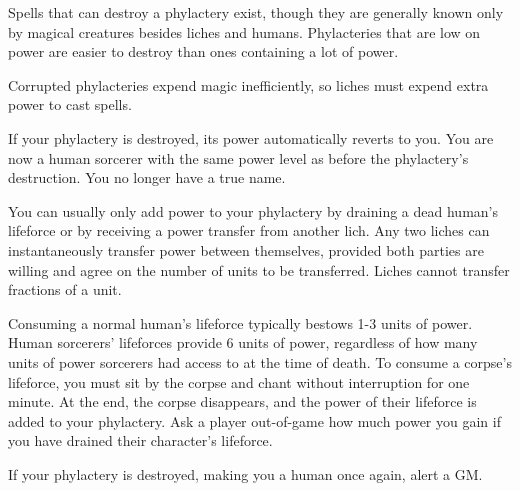 \documentclass[green]{Sel}
\begin{document}
Spells that can destroy a phylactery exist, though they are generally known only by magical creatures besides liches and humans. Phylacteries that are low on power are easier to destroy than ones containing a lot of power.

Corrupted phylacteries expend magic inefficiently, so liches must expend extra power to cast spells.

If your phylactery is destroyed, its power automatically reverts to you. You are now a human sorcerer with the same power level as before the phylactery's destruction. You no longer have a true name.

You can usually only add power to your phylactery by draining a dead human's lifeforce or by receiving a power transfer from another lich. Any two liches can instantaneously transfer power between themselves, provided both parties are willing and agree on the number of units to be transferred. Liches cannot transfer fractions of a unit.

Consuming a normal human's lifeforce typically bestows 1-3 units of power. Human sorcerers' lifeforces provide 6 units of power, regardless of how many units of power sorcerers had access to at the time of death. To consume a corpse's lifeforce, you must sit by the corpse and chant without interruption for one minute. At the end, the corpse disappears, and the power of their lifeforce is added to your phylactery. Ask a player out-of-game how much power you gain if you have drained their character's lifeforce.

If your phylactery is destroyed, making you a human once again, alert a GM.
\end{document}
